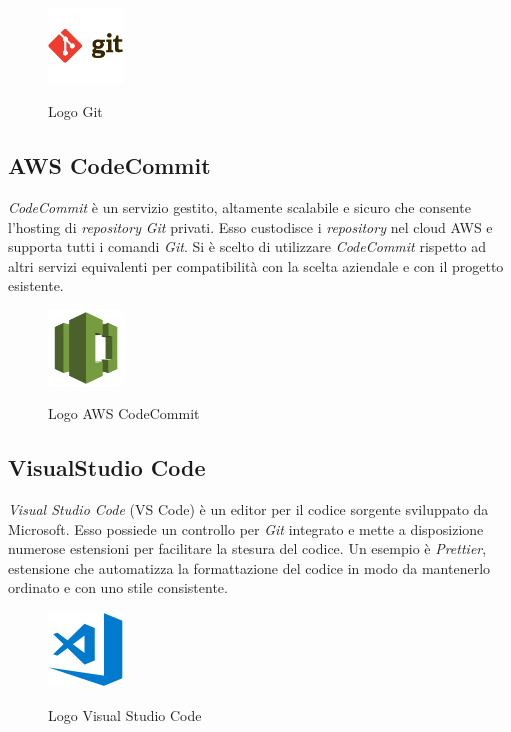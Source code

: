 	\begin{figure}[H]
		\centering
		\includegraphics[width=2cm]{immagini/git.png} \\
		\caption{\label{fig:logo_git} Logo Git}
	\end{figure}

	\subsection{AWS CodeCommit}
	\emph{CodeCommit} è un servizio gestito, altamente scalabile e sicuro che consente l'hosting di \emph{repository} \emph{Git} privati. Esso custodisce i \emph{repository} nel cloud \gls{AWS} e supporta tutti i comandi \emph{Git}. Si è scelto di utilizzare \emph{CodeCommit} rispetto ad altri servizi equivalenti per compatibilità con la scelta aziendale e con il progetto esistente.
	
	\begin{figure}[H]
		\centering
		\includegraphics[width=2cm]{immagini/codecommit.png} \\
		\caption{\label{fig:logo_codecommit} Logo AWS CodeCommit}
	\end{figure}

	\subsection{VisualStudio Code}
\emph{Visual Studio Code} (VS Code) è un editor per il codice sorgente sviluppato da Microsoft. Esso possiede un controllo per \emph{Git} integrato e mette a disposizione numerose estensioni per facilitare la stesura del codice. Un esempio è \emph{Prettier}, estensione che automatizza la formattazione del codice in modo da mantenerlo ordinato e con uno stile consistente.
	
	\begin{figure}[H]
		\centering
		\includegraphics[width=2cm]{immagini/visual-studio-code.png} \\
		\caption{\label{fig:logo_vscode} Logo Visual Studio Code}
	\end{figure}

